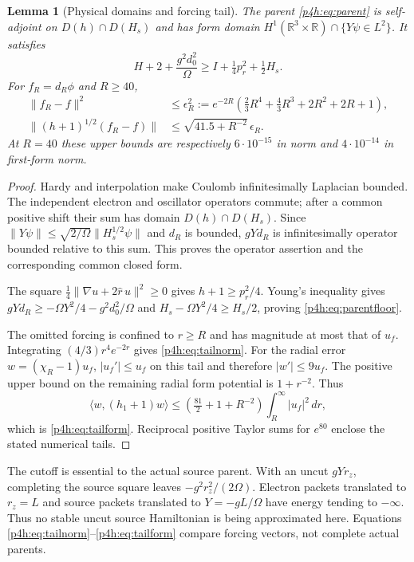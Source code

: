 \documentclass[11pt]{article}
\numberwithin{equation}{section}
\newtheorem{lemma}[theorem]{Lemma}
\theoremstyle{definition}
\theoremstyle{remark}
\begin{document}
\begin{lemma}[Physical domains and forcing tail]
\label{p4h:lem:parent}
The parent \eqref{p4h:eq:parent} is self-adjoint on
$D(h)\cap D(H_s)$ and has form domain
$H^1(\mathbb R^3\times\mathbb R)\cap\{Y\psi\in L^2\}$.
It satisfies
\begin{equation}\label{p4h:eq:parentfloor}
 H+2+\frac{g^2d_0^2}{\Omega}
             \geq I+\tfrac14p_r^2+\tfrac12H_s .
\end{equation}
For $f_R=d_R\phi$ and $R\geq40$,
\begin{align}
 \|f_R-f\|^2&\leq\epsilon_R^2:=
 e^{-2R}\left(\tfrac23R^4+\tfrac43R^3+2R^2+2R+1\right),
 \label{p4h:eq:tailnorm}\\
 \|(h+1)^{1/2}(f_R-f)\|
 &\leq\sqrt{41.5+R^{-2}}\,\epsilon_R .
 \label{p4h:eq:tailform}
\end{align}
At $R=40$ these upper bounds are respectively
$6\cdot10^{-15}$ in norm and $4\cdot10^{-14}$ in first-form norm.
\end{lemma}
\begin{proof}
Hardy and interpolation make Coulomb infinitesimally
Laplacian bounded. The independent electron and oscillator
operators commute; after a common positive shift their sum
has domain $D(h)\cap D(H_s)$.
Since
$\|Y\psi\|\leq\sqrt{2/\Omega}\|H_s^{1/2}\psi\|$ and $d_R$
is bounded, $gYd_R$ is infinitesimally operator bounded
relative to this sum. This proves the operator assertion and
the corresponding common closed form.

The square
$\frac14\|\nabla u+2\widehat r\,u\|^2\geq0$ gives
$h+1\geq p_r^2/4$. Young's inequality gives
$gYd_R\geq-\Omega Y^2/4-g^2d_0^2/\Omega$ and
$H_s-\Omega Y^2/4\geq H_s/2$, proving
\eqref{p4h:eq:parentfloor}.

The omitted forcing is confined to $r\geq R$ and has magnitude
at most that of $u_f$. Integrating
$(4/3)r^4e^{-2r}$ gives \eqref{p4h:eq:tailnorm}.
For the radial error $w=(\chi_R-1)u_f$,
$|u_f'|\leq u_f$ on this tail and therefore $|w'|\leq9u_f$.
The positive upper bound on the remaining radial form
potential is $1+r^{-2}$. Thus
\[
 \langle w,(h_1+1)w\rangle
       \leq\left(\tfrac{81}2+1+R^{-2}\right)
                          \int_R^\infty|u_f|^2\,dr,
\]
which is \eqref{p4h:eq:tailform}. Reciprocal positive Taylor
sums for $e^{80}$ enclose the stated numerical tails.
\end{proof}

The cutoff is essential to the actual source parent.
With an uncut $gYr_z$, completing the source square leaves
$-g^2r_z^2/(2\Omega)$. Electron packets translated to
$r_z=L$ and source packets translated to $Y=-gL/\Omega$
have energy tending to $-\infty$. Thus no stable uncut
source Hamiltonian is being approximated here.
Equations \eqref{p4h:eq:tailnorm}--\eqref{p4h:eq:tailform}
compare forcing vectors, not complete actual parents.
\end{document}
